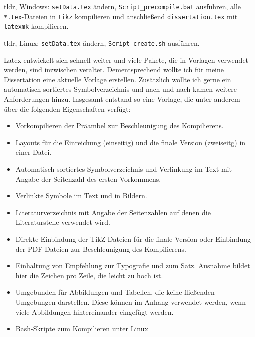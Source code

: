 
tldr, Windows: \texttt{setData.tex} ändern, \texttt{Script\_precompile.bat} ausführen, alle \texttt{*.tex}-Dateien in \texttt{tikz} kompilieren und anschließend \texttt{dissertation.tex} mit \texttt{latexmk} kompilieren.

tldr, Linux: \texttt{setData.tex} ändern, \texttt{Script\_create.sh} ausführen.

Latex entwickelt sich schnell weiter und viele Pakete, die in Vorlagen verwendet werden, sind inzwischen veraltet. Dementsprechend wollte ich für meine Dissertation eine aktuelle Vorlage erstellen. Zusätzlich wollte ich gerne ein automatisch sortiertes Symbolverzeichnis und nach und nach kamen weitere Anforderungen hinzu. Insgesamt entstand so eine Vorlage, die unter anderem über die folgenden Eigenschaften verfügt:

\begin{itemize}
	\item Vorkompilieren der Präambel zur Beschleunigung des Kompilierens.
	\item Layouts für die Einreichung (einseitig) und die finale Version (zweiseitg) in einer Datei.
	\item Automatisch sortiertes Symbolverzeichnis und Verlinkung im Text mit Angabe der Seitenzahl des ersten Vorkommens.
	\item Verlinkte Symbole im Text und in Bildern.
	\item Literaturverzeichnis mit Angabe der Seitenzahlen auf denen die Literaturstelle verwendet wird.
	\item Direkte Einbindung der TikZ-Dateien für die finale Version oder Einbindung der PDF-Dateien zur Beschleunigung des Kompilierens.
	\item Einhaltung von Empfehlung zur Typografie und zum Satz. Ausnahme bildet hier die Zeichen pro Zeile, die leicht zu hoch ist.
	\item Umgebunden für Abbildungen und Tabellen, die keine fließenden Umgebungen darstellen. Diese können im Anhang verwendet werden, wenn viele Abbildungen hintereinander eingefügt werden.
	\item Bash-Skripte zum Kompilieren unter Linux
\end{itemize}